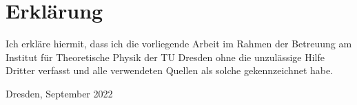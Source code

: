 \thispagestyle{empty}
\section*{Erklärung}

Ich erkläre hiermit, dass ich die vorliegende Arbeit im Rahmen der Betreuung am
Institut für Theoretische Physik der TU Dresden ohne die unzulässige Hilfe Dritter
verfasst und alle verwendeten Quellen als solche gekennzeichnet habe.

\vfill

{
  \makeatletter
  \@author
  \makeatother
}

\vspace{2em}
Dresden, September 2022
